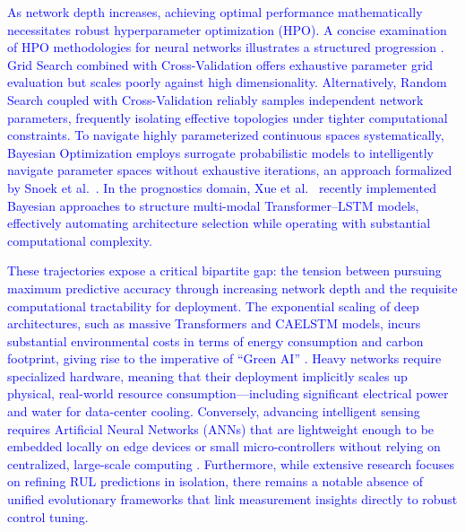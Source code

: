 \documentclass[12pt, a4paper]{article}
\begin{document}
\textcolor{blue}{As network depth increases, achieving optimal performance mathematically necessitates robust hyperparameter optimization (HPO). A concise examination of HPO methodologies for neural networks illustrates a structured progression \cite{Yang2020Hyperparameter}. Grid Search combined with Cross-Validation offers exhaustive parameter grid evaluation but scales poorly against high dimensionality. Alternatively, Random Search coupled with Cross-Validation reliably samples independent network parameters, frequently isolating effective topologies under tighter computational constraints. To navigate highly parameterized continuous spaces systematically, Bayesian Optimization employs surrogate probabilistic models to intelligently navigate parameter spaces without exhaustive iterations, an approach formalized by Snoek et al.~\cite{Snoek2012Practical}. In the prognostics domain, Xue et al.~\cite{Xue2025} recently implemented Bayesian approaches to structure multi-modal Transformer–LSTM models, effectively automating architecture selection while operating with substantial computational complexity.}

\textcolor{blue}{These trajectories expose a critical bipartite gap: the tension between pursuing maximum predictive accuracy through increasing network depth and the requisite computational tractability for deployment. The exponential scaling of deep architectures, such as massive Transformers and CAELSTM models, incurs substantial environmental costs in terms of energy consumption and carbon footprint, giving rise to the imperative of ``Green AI'' \cite{Schwartz2020GreenAI, Strubell2019Energy, Garcia2019Estimation, Dhar2021Survey, Wu2022Sustainable, Patterson2021Carbon}. Heavy networks require specialized hardware, meaning that their deployment implicitly scales up physical, real-world resource consumption—including significant electrical power and water for data-center cooling. Conversely, advancing intelligent sensing requires Artificial Neural Networks (ANNs) that are lightweight enough to be embedded locally on edge devices or small micro-controllers without relying on centralized, large-scale computing \cite{Li2023Edge, Merenda2020Edge, Wang2020Convergence, Zhou2019Edge, Jiang2021Model, Chen2019Deep}. Furthermore, while extensive research focuses on refining RUL predictions in isolation, there remains a notable absence of unified evolutionary frameworks that link measurement insights directly to robust control tuning.}
\end{document}
